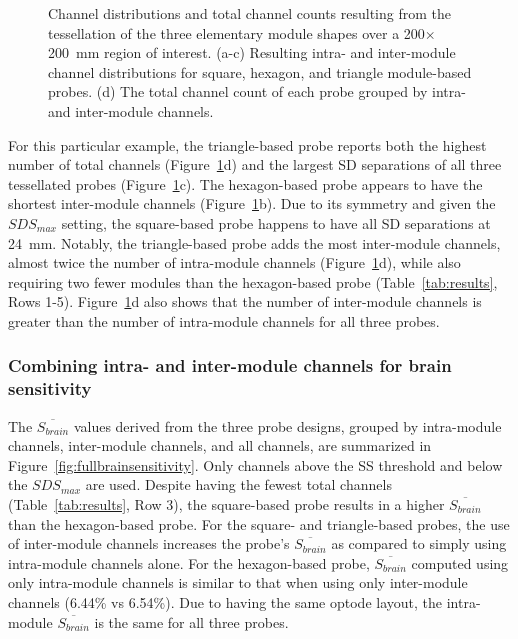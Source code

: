 \begin{figure}
\begin{center}
    \end{center}
    \caption {Channel distributions and total channel counts resulting from the tessellation of the three elementary module shapes over a 200$\times$200~mm region of interest. (a-c) Resulting intra- and inter-module channel distributions for square, hexagon, and triangle module-based probes. (d) The total channel count of each probe grouped by intra- and inter-module channels.} 
    \label{fig:fullchannels}
\end{figure} 

For this particular example, the triangle-based probe reports both the highest number of total channels (Figure~\ref{fig:fullchannels}d) and the largest \ac{SD} separations of all three tessellated probes (Figure~\ref{fig:fullchannels}c). The hexagon-based probe appears to have the shortest inter-module channels (Figure~\ref{fig:fullchannels}b). Due to its symmetry and given the $SDS_{max}$ setting, the square-based probe happens to have all \ac{SD} separations at 24~mm. Notably, the triangle-based probe adds the most inter-module channels, almost twice the number of intra-module channels (Figure~\ref{fig:fullchannels}d), while also requiring two fewer modules than the hexagon-based probe (Table~\ref{tab:results}, Rows 1-5). Figure~\ref{fig:fullchannels}d also shows that the number of inter-module channels is greater than the number of intra-module channels for all three probes.


\subsubsection{Combining intra- and inter-module channels for brain sensitivity}
The $\overline{S_{brain}}$ values derived from the three probe designs, grouped by intra-module channels, inter-module channels, and all channels, are summarized in Figure~\ref{fig:fullbrainsensitivity}. Only channels above the \ac{SS} threshold and below the $SDS_{max}$ are used. Despite having the fewest total channels (Table~\ref{tab:results}, Row 3), the square-based probe results in a higher $\overline{S_{brain}}$ than the hexagon-based probe. For the square- and triangle-based probes, the use of inter-module channels increases the probe's $\overline{S_{brain}}$ as compared to simply using intra-module channels alone. For the hexagon-based probe, $\overline{S_{brain}}$ computed using only intra-module channels is similar to that when using only inter-module channels (6.44\% vs 6.54\%). Due to having the same optode layout, the intra-module $\overline{S_{brain}}$ is the same for all three probes. 

